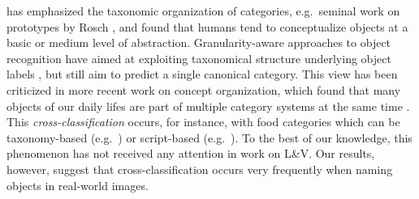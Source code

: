 has emphasized the taxonomic organization of categories, e.g.\ seminal work on prototypes by Rosch \cite{rosch1976basic},  and found that humans tend to conceptualize objects at a basic or medium level of abstraction.
Granularity-aware approaches to object recognition have aimed at exploiting taxonomical structure underlying object labels \cite{deng2014large,wang2014poodle,peterson2018learning},  
but still aim to predict a single canonical category.%
This view has been criticized in more recent work on concept organization, which found that many objects of our daily lifes are part of multiple category systems at the same time \cite{ross1999food,SHAFTO20111}.  This \textit{cross-classification} occurs, for instance, with food categories which can be taxonomy-based (e.g.\  ) or script-based (e.g.\  ).
To the best of our knowledge, this phenomenon has not received any attention in work on L\&V.
Our results, however, suggest that cross-classification occurs very frequently when naming objects in real-world images.
 



